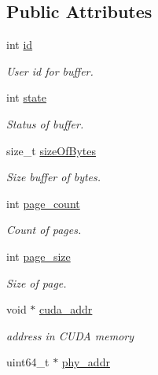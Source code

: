 \subsection*{Public Attributes}
\begin{DoxyCompactItemize}
\item 
int \hyperlink{structCL__Cuda_1_1BAR1__BUF_a8af9f6eea7e56fddd4b787779e874adb}{id}
\begin{DoxyCompactList}\small\item\em User id for buffer. \item\end{DoxyCompactList}\item 
int \hyperlink{structCL__Cuda_1_1BAR1__BUF_a3290eaf7a39a6f8ed79829ec1b62801a}{state}
\begin{DoxyCompactList}\small\item\em Status of buffer. \item\end{DoxyCompactList}\item 
size\_\-t \hyperlink{structCL__Cuda_1_1BAR1__BUF_a9919f6ce31f58f31e93552171e1de5ea}{sizeOfBytes}
\begin{DoxyCompactList}\small\item\em Size buffer of bytes. \item\end{DoxyCompactList}\item 
int \hyperlink{structCL__Cuda_1_1BAR1__BUF_a6ea1b2d3c511faee8ddb0185b005b177}{page\_\-count}
\begin{DoxyCompactList}\small\item\em Count of pages. \item\end{DoxyCompactList}\item 
int \hyperlink{structCL__Cuda_1_1BAR1__BUF_a3199bd167acc38097fbdbe0fef227b1a}{page\_\-size}
\begin{DoxyCompactList}\small\item\em Size of page. \item\end{DoxyCompactList}\item 
void $\ast$ \hyperlink{structCL__Cuda_1_1BAR1__BUF_abf1412171544f2f49dc08f7a9075b1bf}{cuda\_\-addr}
\begin{DoxyCompactList}\small\item\em address in CUDA memory \item\end{DoxyCompactList}\item 
uint64\_\-t $\ast$ \hyperlink{structCL__Cuda_1_1BAR1__BUF_a0f74a0b65b2f431fa03a573002ca0d2f}{phy\_\-addr}

\end{DoxyCompactItemize}
